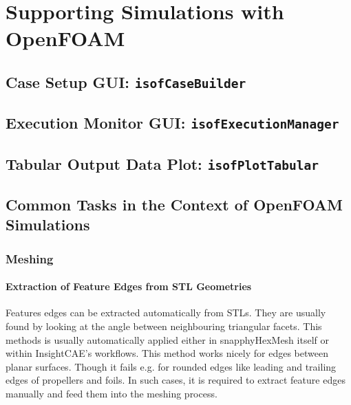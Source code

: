 \section{Supporting Simulations with OpenFOAM}

\subsection{Case Setup GUI: \texttt{isofCaseBuilder}}

\subsection{Execution Monitor GUI: \texttt{isofExecutionManager}}

\subsection{Tabular Output Data Plot: \texttt{isofPlotTabular}}

\subsection{Common Tasks in the Context of OpenFOAM Simulations}

\subsubsection{Meshing}



\paragraph{Extraction of Feature Edges from STL Geometries}

Features edges can be extracted automatically from STLs. 
They are usually found by looking at the angle between neighbouring triangular facets.
This methods is usually automatically applied either in snapphyHexMesh itself or within InsightCAE's workflows.
This method works nicely for edges between planar surfaces.
Though it fails e.g. for rounded edges like leading and trailing edges of propellers and foils.
In such cases, it is required to extract feature edges manually and feed them into the meshing process.

